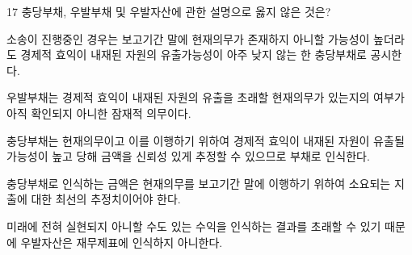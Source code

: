 \begin{question}{17}
충당부채, 우발부채 및 우발자산에 관한 설명으로 옳지 않은 것은?
\begin{choices}
  \item 소송이 진행중인 경우는 보고기간 말에 현재의무가 존재하지 아니할 가능성이 높더라도 경제적 효익이 내재된 자원의 유출가능성이 아주 낮지 않는 한 충당부채로 공시한다.
  \item 우발부채는 경제적 효익이 내재된 자원의 유출을 초래할 현재의무가 있는지의 여부가 아직 확인되지 아니한 잠재적 의무이다.
  \item 충당부채는 현재의무이고 이를 이행하기 위하여 경제적 효익이 내재된 자원이 유출될 가능성이 높고 당해 금액을 신뢰성 있게 추정할 수 있으므로 부채로 인식한다.
  \item 충당부채로 인식하는 금액은 현재의무를 보고기간 말에 이행하기 위하여 소요되는 지출에 대한 최선의 추정치이어야 한다.
  \item 미래에 전혀 실현되지 아니할 수도 있는 수익을 인식하는 결과를 초래할 수 있기 때문에 우발자산은 재무제표에 인식하지 아니한다.
\end{choices}
\end{question}
